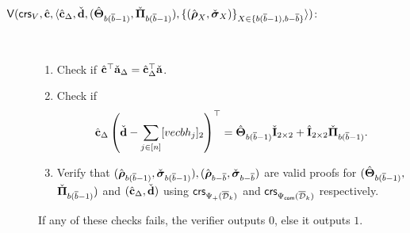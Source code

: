 \begin{description}
\item[$\mathsf{V}(
    \mathsf{crs}_V,
    {\hat{\mathbf{c}}},
    \langle
        {\hat{\mathbf{c}}}_{\Delta}, \check{\mathbf{d}},
        ({\hat{\mathbf{{\Theta}}}}_{b(\overline{b}-1)}, \check{\mathbf{{\Pi}}}_{b(\overline{b}-1)}), 
        \{(\hat{\boldsymbol \rho}_{X}, \check{\boldsymbol \sigma}_{X})\}_{X \in \{b(\overline{b}-1), b-\overline{b}\}} \rangle)$:] ~
%   
\begin{enumerate}
\item  Check if ${\hat{\mathbf{c}}}^\top\check{\mathbf{a}}_\Delta = {\hat{\mathbf{c}}}_\Delta^\top\check{\mathbf{a}}$. 
\item Check if 
\begin{equation}\label{eq:ver1}{\hat{\mathbf{c}}}_{\Delta}
\left(
    \check{\mathbf{d}}-
    \sum_{j \in [n]} [vecb{h}_{j}]_2
\right)^{\top} =
    {\hat{\mathbf{{\Theta}}}}_{b(\overline{b}-1)} \check{\mathbf{{I}}}_{2 \times 2} +
    {\hat{\mathbf{{I}}}}_{2 \times 2}\check{\mathbf{{\Pi}}}_{b(\overline{b}-1)}.
    \end{equation}  
  \item Verify that $(\hat{{\boldsymbol \rho}}_{b(\overline{b}-1)}, \check{{\boldsymbol \sigma}}_{b(\overline{b}-1)}),(\hat{{\boldsymbol \rho}}_{b-\overline{b}},\check{{\boldsymbol \sigma}}_{b-\overline{b}})$ are valid proofs for %
  $({\hat{\mathbf{{\Theta}}}}_{b(\overline{b}-1)},$ $\check{\mathbf{{\Pi}}}_{b(\overline{b}-1)})$
        and $({\hat{\mathbf{c}}}_\Delta,\check{\mathbf{d}})$ using $\mathsf{crs}_{\Psi_{+}(\overline{\mathcal{D}}_k)}$ and $\mathsf{crs}_{{\Psi_{\mathsf{com}}(\overline{\mathcal{D}}_k)}}$ respectively.
\end{enumerate}
If any of these checks fails, the verifier outputs $0$, else it outputs $1$.

\end{description}
